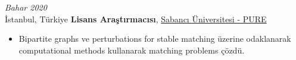 \vspace{\betweenentryspace}

\begin{twocolentry}{
    \textit{Bahar 2020}\\
    \small İstanbul, Türkiye}
    \normalsize \textbf{Lisans Araştırmacısı}, \small \href{https://pure.sabanciuniv.edu/project/4041/solving-matching-problems-using-artificial-intelligence-interview-scheduling}{Sabancı Üniversitesi - PURE}

    \small  
    \begin{itemize}
        \item Bipartite graphs ve perturbations for stable matching üzerine odaklanarak computational methods kullanarak matching problems çözdü.
    \end{itemize}
\end{twocolentry}
